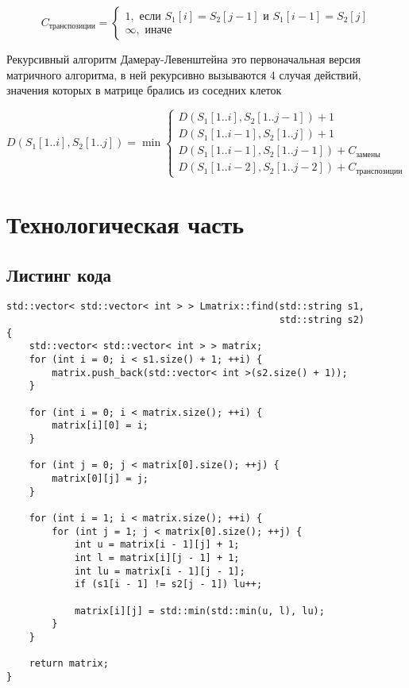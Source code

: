 ﻿\documentclass[a4paper,12pt]{article}
\begin{document}
    $$
    C_\text{транспозиции} = 
    \begin{cases}
        1, \text{ если } S_1[i] = S_2[j - 1] \text{ и } S_1[i-1] = S_2[j] \\
        \infty, \text{ иначе}
    \end{cases}
    $$

    Рекурсивный алгоритм Дамерау-Левенштейна это первоначальная версия матричного алгоритма, в ней рекурсивно вызываются 4 случая действий, значения которых в матрице брались из соседних клеток

    $$
    D(S_1[1..i], S_2[1..j]) = \min 
    \begin{cases}
        D(S_1[1..i], S_2[1..j-1]) + 1 \\
        D(S_1[1..i-1], S_2[1..j]) + 1 \\
        D(S_1[1..i-1], S_2[1..j-1]) + C_\text{замены} \\
        D(S_1[1..i-2], S_2[1..j-2]) + C_\text{транспозиции}
    \end{cases}
    $$

    \newpage
    \section{Технологическая часть}
    \subsection{Листинг кода}

    \begin{lstlisting}[caption=Расстояние Левенштейна матричный метод]
std::vector< std::vector< int > > Lmatrix::find(std::string s1,
                                                std::string s2)
{
    std::vector< std::vector< int > > matrix;
    for (int i = 0; i < s1.size() + 1; ++i) {
        matrix.push_back(std::vector< int >(s2.size() + 1));
    }

    for (int i = 0; i < matrix.size(); ++i) {
        matrix[i][0] = i;
    }

    for (int j = 0; j < matrix[0].size(); ++j) {
        matrix[0][j] = j;
    }

    for (int i = 1; i < matrix.size(); ++i) {
        for (int j = 1; j < matrix[0].size(); ++j) {
            int u = matrix[i - 1][j] + 1;
            int l = matrix[i][j - 1] + 1;
            int lu = matrix[i - 1][j - 1];
            if (s1[i - 1] != s2[j - 1]) lu++;

            matrix[i][j] = std::min(std::min(u, l), lu);
        }
    }

    return matrix;
}
    \end{lstlisting}
\end{document}
